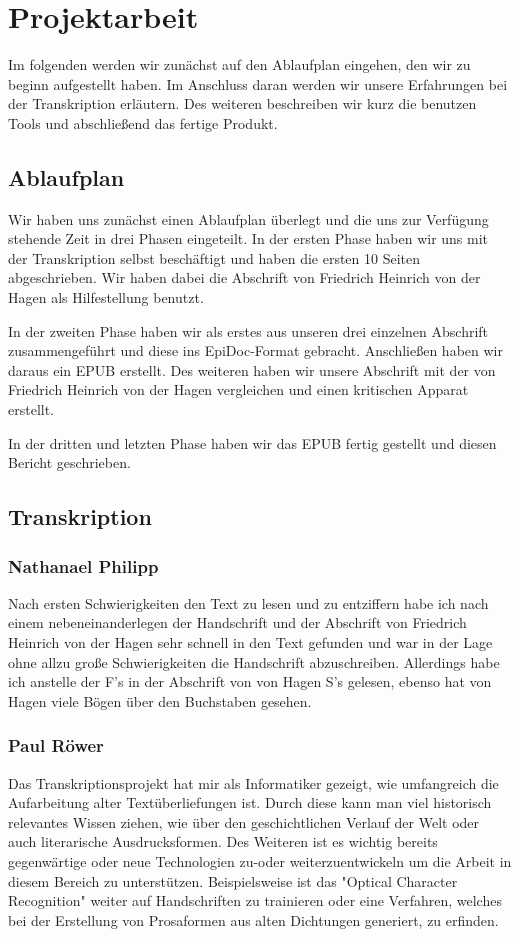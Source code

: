 \documentclass[a4paper, 12pt, oneside]{scrbook}
\begin{document}
\chapter{Projektarbeit}
Im folgenden werden wir zunächst auf den Ablaufplan eingehen, den wir zu beginn aufgestellt haben. Im Anschluss daran werden wir unsere Erfahrungen bei der Transkription erläutern. Des weiteren beschreiben wir kurz die benutzen Tools und abschließend das fertige Produkt.

\section{Ablaufplan}
Wir haben uns zunächst einen Ablaufplan überlegt und die uns zur Verfügung stehende Zeit in drei Phasen eingeteilt. In der ersten Phase haben wir uns mit der Transkription selbst beschäftigt und haben die ersten 10 Seiten abgeschrieben. Wir haben dabei die Abschrift von Friedrich Heinrich von der Hagen\cite{fhvdh_helden} als Hilfestellung benutzt.

In der zweiten Phase haben wir als erstes aus unseren drei einzelnen Abschrift zusammengeführt und diese ins EpiDoc-Format gebracht. Anschließen haben wir daraus ein EPUB erstellt. Des weiteren haben wir unsere Abschrift mit der von Friedrich Heinrich von der Hagen vergleichen und einen kritischen Apparat erstellt.

In der dritten und letzten Phase haben wir das EPUB fertig gestellt und diesen Bericht geschrieben.
\section{Transkription}
\subsection{Nathanael Philipp}
Nach ersten Schwierigkeiten den Text zu lesen und zu entziffern habe ich nach einem nebeneinanderlegen der Handschrift und der Abschrift von Friedrich Heinrich von der Hagen sehr schnell in den Text gefunden und war in der Lage ohne allzu große Schwierigkeiten die Handschrift abzuschreiben. Allerdings habe ich anstelle der F's in der Abschrift von von Hagen S's gelesen, ebenso hat von Hagen viele Bögen über den Buchstaben gesehen.

\subsection{Paul Röwer}
Das Transkriptionsprojekt hat mir als Informatiker gezeigt, wie umfangreich die Aufarbeitung alter Textüberliefungen ist. Durch diese kann man viel historisch relevantes Wissen ziehen, wie über den geschichtlichen Verlauf der Welt oder auch literarische Ausdrucksformen. Des Weiteren ist es wichtig bereits gegenwärtige oder neue Technologien  zu-oder weiterzuentwickeln um die Arbeit in diesem Bereich zu unterstützen. Beispielsweise ist das "Optical Character Recognition" weiter auf Handschriften zu trainieren oder eine Verfahren, welches bei der Erstellung von Prosaformen aus alten Dichtungen generiert, zu erfinden.
\end{document}
